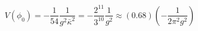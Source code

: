 \begin{equation}
V (\phi_0) = -\frac{1}{54}  \frac{1}{g^2 \bar{\kappa}^2}  =
-\frac{2^{11}}{3^{10}}  \frac{1}{g^2} 
\approx (0.68) \left( -\frac{1}{2 \pi^2 g^2}  \right)
\end{equation}


